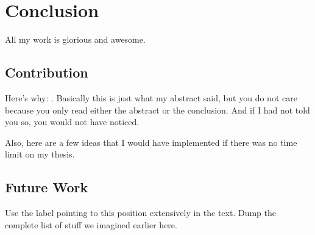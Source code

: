 
\chapter{Conclusion}
	\label{chapter:conclusion}
	All my work is glorious and awesome.

	\section{Contribution}
		\label{sec:conclusion:contribution}
		Here's why: \@. Basically this is just what my abstract said, but you do not care because you only read either
		the abstract or the conclusion. And if I had not told you so, you would not have noticed.

		Also, here are a few ideas that I would have implemented if there was no time limit on my thesis.

	\section{Future Work}
		\label{sec:conclusion:future-work}
		Use the label pointing to this position extensively in the text. Dump the complete list of stuff we imagined earlier
		here.
